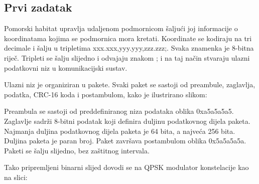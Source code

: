 \documentclass[a4paper]{article}
\begin{document}
\subsection{Prvi zadatak}
Pomorski habitat upravlja udaljenom podmornicom šaljući joj informacije o koordinatama kojima se podmornica mora kretati. Koordinate se kodiraju na tri decimale i šalju u tripletima xxx.xxx,yyy.yyy,zzz.zzz;. Svaka znamenka je 8-bitna riječ. Tripleti se šalju slijedno i odvajaju znakom ; i na taj način stvaraju ulazni podatkovni niz u komunikacijski sustav.

Ulazni niz je organiziran u pakete. Svaki paket se sastoji od preambule, zaglavlja, podatka, CRC-16 koda i postambulom, kako je ilustrirano slikom:


\begin{figure}[h!]
\centering
{}
\end{figure}

Preambula se sastoji od preddefiniranog niza podataka oblika 0xa5a5a5a5. Zaglavlje sadrži 8-bitni podatak koji definira duljinu podatkovnog dijela paketa. Najmanja duljina podatkovnog dijela paketa je 64 bita, a najveća 256 bita. Duljina paketa je paran broj. Paket završava postambulom oblika 0x5a5a5a5a. Paketi se šalju slijedno, bez zaštitnog intervala.

Tako pripremljeni binarni slijed dovodi se na QPSK modulator konstelacije kao na slici:
\end{document}

